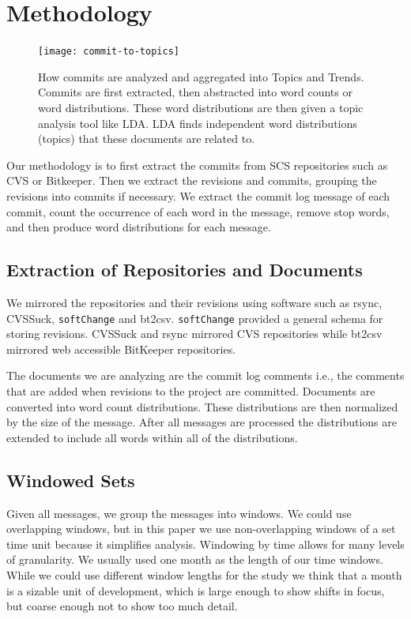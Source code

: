 \documentclass[times, 10pt,twocolumn]{article}
\newcommand{\shrinkit}{\vspace*{-.3em}}
\begin{document}
\shrinkit
\section{Methodology}
\shrinkit
\begin{figure}
  \centering
  \texttt{[image: commit-to-topics]} 
  \caption{How commits are analyzed and aggregated into Topics and Trends. Commits are first extracted, then abstracted into word counts or word distributions. These word distributions are then given a topic analysis tool like LDA. LDA finds independent word distributions (topics) that these documents are related to.}
  \label{fig:commits}
\end{figure}

Our methodology is to first extract the commits from SCS repositories
such as CVS or Bitkeeper. Then we extract the revisions and commits,
grouping the revisions into commits if necessary. We extract the
commit log message of each commit, count the occurrence of each word
in the message, remove stop words, and then produce word distributions
for each message.


\shrinkit
\subsection{Extraction of  Repositories and Documents}
\shrinkit

We mirrored the repositories and their revisions using software such
as rsync, CVSSuck, \texttt{softChange} and bt2csv.
\texttt{softChange} provided a general schema for storing
revisions. CVSSuck and rsync mirrored CVS repositories while bt2csv
mirrored web accessible BitKeeper repositories.

The documents we are analyzing are the commit log comments i.e., the
comments that are added when revisions to the project are committed.
Documents are converted into word count distributions. These
distributions are then normalized by the size of the message. After
all messages are processed the distributions are extended to include
all words within all of the  distributions.

\shrinkit
\subsection{Windowed Sets}
\shrinkit

Given all messages, we group the messages into windows. We could use
overlapping windows, but in this paper we use non-overlapping windows
of a set time unit because it simplifies analysis.  Windowing by time
allows for many levels of granularity.  We usually used one month as
the length of our time windows. While we could use different window
lengths for the study we think that a month is a sizable unit of
development, which is large enough to show shifts in focus, but coarse
enough not to show too much detail.
\end{document}
